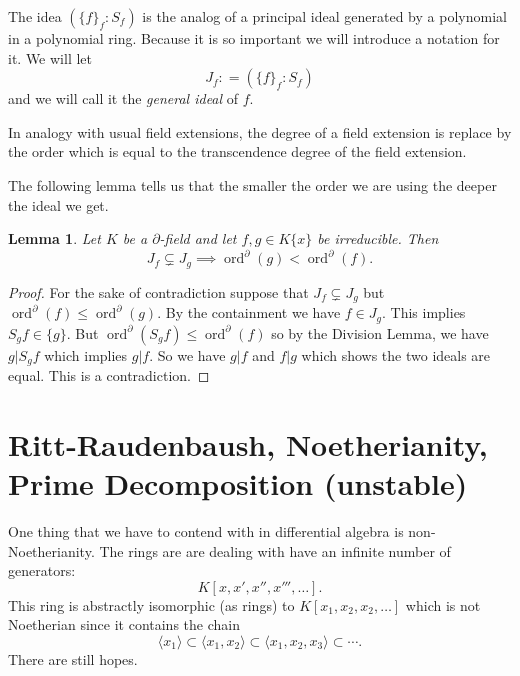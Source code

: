 \documentclass[12pt]{book}
\numberwithin{equation}{section}
\newtheorem{lemma}[theorem]{Lemma}
\theoremstyle{definition}
\theoremstyle{remark}
\newcommand{\ord}{\operatorname{ord}}
\begin{document}
The idea $( \lbrace f \rbrace_f \colon S_f )$ is the analog of a principal ideal generated by a polynomial in a polynomial ring. 
Because it is so important we will introduce a notation for it. 
We will let 
 $$ J_f \colon = ( \lbrace f \rbrace_f \colon S_f ) $$
and we will call it the \emph{general ideal} of $f$.

In analogy with usual field extensions, the degree of a field extension is replace by the order which is equal to the transcendence degree of the field extension.

The following lemma tells us that the smaller the order we are using the deeper the ideal we get.
\begin{lemma}
	Let $K$ be a $\partial$-field and let $f,g \in K\lbrace x \rbrace$ be irreducible. 
	Then
	 $$J_f \subsetneq J_g \implies \ord^{\partial}(g) < \ord^{\partial}(f). $$
\end{lemma}
\begin{proof}
	For the sake of contradiction suppose that $J_f \subsetneq J_g$ but $\ord^{\partial}(f)\leq \ord^{\partial}(g)$.
	By the containment we have $f \in J_g$.
	This implies $S_gf \in \lbrace g\rbrace$.
	But $\ord^{\partial}(S_gf) \leq \ord^{\partial}(f)$ so by the Division Lemma, we have $g \vert S_g f$ which implies $g\vert f$.
	So we have $g \vert f$ and $f\vert g$ which shows the two ideals are equal.
	This is a contradiction.
\end{proof}


\section{Ritt-Raudenbaush, Noetherianity, Prime Decomposition (unstable)}

One thing that we have to contend with in differential algebra is non-Noetherianity. 
The rings are are dealing with have an infinite number of generators:
$$ K[x,x',x'',x''',\ldots].$$
This ring is abstractly isomorphic (as rings) to $K[x_1,x_2,x_2,\ldots]$ which is not Noetherian since it contains the chain 
$$\langle x_1 \rangle \subset \langle x_1,x_2\rangle \subset \langle x_1,x_2,x_3\rangle \subset \cdots.$$
There are still hopes.
\end{document}
